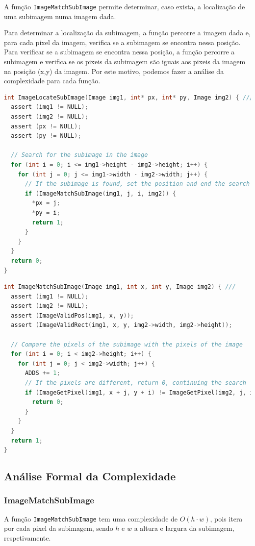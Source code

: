 \documentclass{report}
\begin{document}
A função \texttt{ImageMatchSubImage} permite determinar, caso exista, a localização de uma subimagem numa imagem dada.
\par
Para determinar a localização da subimagem, a função percorre a imagem dada e, para cada pixel da imagem, verifica se a subimagem se encontra nessa posição. 
Para verificar se a subimagem se encontra nessa posição, a função percorre a subimagem e verifica se os pixeis da subimagem são iguais aos pixeis da imagem na posição (x,y) da imagem.
Por este motivo, podemos fazer a análise da complexidade para cada função.
\par
\begingroup
\begin{lstlisting}[language=C]
int ImageLocateSubImage(Image img1, int* px, int* py, Image img2) { ///
  assert (img1 != NULL);
  assert (img2 != NULL);
  assert (px != NULL);
  assert (py != NULL);

  // Search for the subimage in the image
  for (int i = 0; i <= img1->height - img2->height; i++) {
    for (int j = 0; j <= img1->width - img2->width; j++) {
      // If the subimage is found, set the position and end the search
      if (ImageMatchSubImage(img1, j, i, img2)) {
        *px = j;
        *py = i;
        return 1;
      }
    }
  }
  return 0;
}
\end{lstlisting}
    
\begin{lstlisting}[language=C]
int ImageMatchSubImage(Image img1, int x, int y, Image img2) { ///
  assert (img1 != NULL);
  assert (img2 != NULL);
  assert (ImageValidPos(img1, x, y));
  assert (ImageValidRect(img1, x, y, img2->width, img2->height));

  // Compare the pixels of the subimage with the pixels of the image
  for (int i = 0; i < img2->height; i++) {
    for (int j = 0; j < img2->width; j++) {
      ADDS += 1;
      // If the pixels are different, return 0, continuing the search
      if (ImageGetPixel(img1, x + j, y + i) != ImageGetPixel(img2, j, i)) {
        return 0;
      }
    }
  }
  return 1;
}
\end{lstlisting}
\endgroup

\subsection{Análise Formal da Complexidade}

\subsubsection*{ImageMatchSubImage}
A função \texttt{ImageMatchSubImage} tem uma complexidade de \(O(h \cdot w)\), pois itera por cada pixel da subimagem, 
sendo \(h\) e \(w\) a altura e largura da subimagem, respetivamente.
\par
\end{document}
